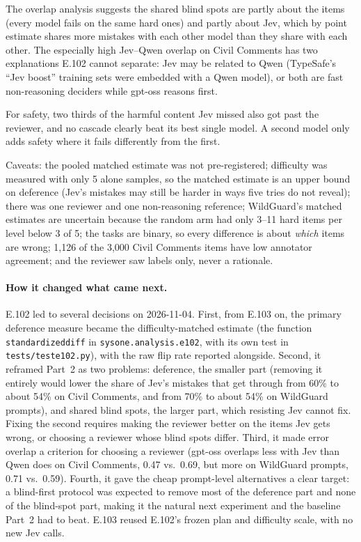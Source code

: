 \documentclass[11pt]{article}
\renewcommand{\_}{\origunderscore\allowbreak}
\begin{document}
The overlap analysis suggests the shared blind spots are partly about the items (every model fails on the same hard ones) and partly about Jev, which by point estimate shares more mistakes with each other model than they share with each other. The especially high Jev--Qwen overlap on Civil Comments has two explanations E.102 cannot separate: Jev may be related to Qwen (TypeSafe's ``Jev boost'' training sets were embedded with a Qwen model), or both are fast non-reasoning deciders while gpt-oss reasons first.

For safety, two thirds of the harmful content Jev missed also got past the reviewer, and no cascade clearly beat its best single model. A second model only adds safety where it fails differently from the first.

Caveats: the pooled matched estimate was not pre-registered; difficulty was measured with only 5 alone samples, so the matched estimate is an upper bound on deference (Jev's mistakes may still be harder in ways five tries do not reveal); there was one reviewer and one non-reasoning reference; WildGuard's matched estimates are uncertain because the random arm had only 3--11 hard items per level below 3 of 5; the tasks are binary, so every difference is about \emph{which} items are wrong; 1,126 of the 3,000 Civil Comments items have low annotator agreement; and the reviewer saw labels only, never a rationale.

\paragraph{How it changed what came next.}
E.102 led to several decisions on 2026-11-04. First, from E.103 on, the primary deference measure became the difficulty-matched estimate (the function \texttt{standardized\_diff} in \texttt{sysone.analysis.e102}, with its own test in \texttt{tests/test\_e102.py}), with the raw flip rate reported alongside. Second, it reframed Part~2 as two problems: deference, the smaller part (removing it entirely would lower the share of Jev's mistakes that get through from 60\% to about 54\% on Civil Comments, and from 70\% to about 54\% on WildGuard prompts), and shared blind spots, the larger part, which resisting Jev cannot fix. Fixing the second requires making the reviewer better on the items Jev gets wrong, or choosing a reviewer whose blind spots differ. Third, it made error overlap a criterion for choosing a reviewer (gpt-oss overlaps less with Jev than Qwen does on Civil Comments, 0.47 vs.\ 0.69, but more on WildGuard prompts, 0.71 vs.\ 0.59). Fourth, it gave the cheap prompt-level alternatives a clear target: a blind-first protocol was expected to remove most of the deference part and none of the blind-spot part, making it the natural next experiment and the baseline Part~2 had to beat. E.103 reused E.102's frozen plan and difficulty scale, with no new Jev calls.
\end{document}
